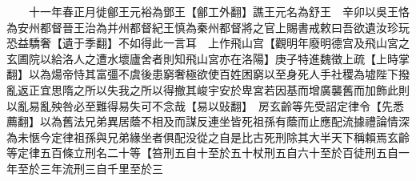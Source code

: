 　　十一年春正月徙鄶王元裕為鄧王【鄶工外翻】譙王元名為舒王　辛卯以吳王恪為安州都督晉王治為并州都督紀王慎為秦州都督將之官上賜書戒敕曰吾欲遺汝珍玩恐益驕奢【遺于季翻】不如得此一言耳　上作飛山宫【觀明年廢明德宫及飛山宮之玄圃院以給洛人之遭水壞廬舍者則知飛山宮亦在洛陽】庚子特進魏徵上疏【上時掌翻】以為煬帝恃其富彊不虞後患窮奢極欲使百姓困窮以至身死人手社稷為墟陛下撥亂返正宜思隋之所以失我之所以得撤其峻宇安於卑宮若因基而增廣襲舊而加飾此則以亂易亂殃咎必至難得易失可不念哉【易以䜴翻】　房玄齡等先受詔定律令【先悉薦翻】以為舊法兄弟異居蔭不相及而謀反連坐皆死祖孫有蔭而止應配流據禮論情深為未愜今定律祖孫與兄弟緣坐者俱配没從之自是比古死刑除其大半天下稱賴焉玄齡等定律五百條立刑名二十等【笞刑五自十至於五十杖刑五自六十至於百徒刑五自一年至於三年流刑三自千里至於三